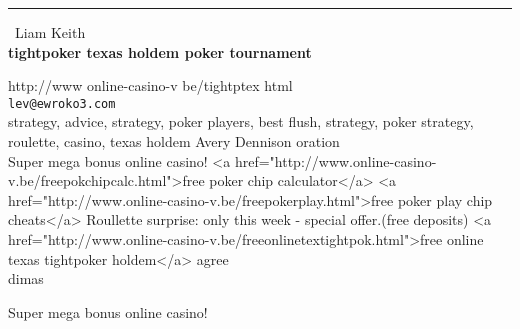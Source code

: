 \documentclass{report}
\begin{document}
\begin{center}
\rule{6in}{1pt} \
{\large Liam Keith \\
{\bf tightpoker texas holdem poker tournament}}

http://www online-casino-v be/tightptex html
\\
{\tt lev@ewroko3.com}\\
strategy, advice, strategy, poker players, best flush, strategy, poker strategy, roulette, casino, texas holdem Avery Dennison oration\\
Super mega bonus online casino!
<a href="http://www.online-casino-v.be/freepokchipcalc.html">free poker chip calculator</a>
<a href="http://www.online-casino-v.be/freepokerplay.html">free poker play chip cheats</a>
Roullette surprise: only this week - special offer.(free deposits)
<a href="http://www.online-casino-v.be/freeonlinetextightpok.html">free online texas tightpoker holdem</a> agree\\
	dimas\end{center}

Super mega bonus online casino!
\end{document}
